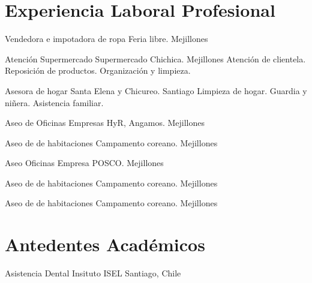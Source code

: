 \documentclass[draft,color,12pt,letterpaper,sans]{moderncv}
\title{}
\begin{document}
\makecvtitle %

\section{Experiencia Laboral Profesional}
{Vendedora e impotadora de ropa}
{}
{\newline Feria libre. Mejillones}
{}
{ }

{Atención Supermercado}
{}
{\newline Supermercado Chichica. Mejillones}
{}
{Atenci\'on de clientela. Reposici\'on de productos. Organizaci\'on y limpieza.\newline}

{Asesora de hogar}
{}
{\newline Santa Elena y Chicureo. Santiago}
{}
{Limpieza de hogar. Guardia y niñera. Asistencia familiar.\newline}

{Aseo de Oficinas}
{}
{\newline Empresas HyR, Angamos. Mejillones}
{}
{}

{Aseo de de habitaciones}
{}
{\newline Campamento coreano. Mejillones}
{}
{}

{Aseo Oficinas}
{}
{\newline Empresa POSCO. Mejillones}
{}
{}

{Aseo de de habitaciones}
{}
{\newline Campamento coreano. Mejillones}
{}
{}

{Aseo de de habitaciones}
{}
{\newline Campamento coreano. Mejillones}
{}
{}



\section{Antedentes Acad\'emicos}
{Asistencia Dental}
{Insituto ISEL}
{Santiago, Chile}
{\textit{}}
{}
\end{document}
